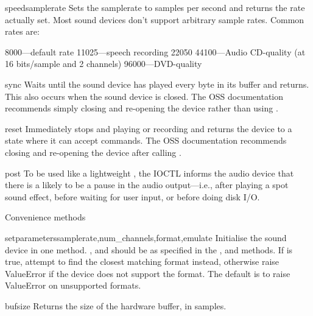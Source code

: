 \begin{methoddesc}{speed}{samplerate}
Sets the samplerate to  samples per second and returns
the rate actually set.  Most sound devices don't support arbitrary
sample rates.  Common rates are:

8000---default rate
11025---speech recording
22050
44100---Audio CD-quality (at 16 bits/sample and 2 channels)
96000---DVD-quality
\end{methoddesc}

\begin{methoddesc}{sync}
Waits until the sound device has played every byte in its buffer and
returns.  This also occurs when the sound device is closed.  The OSS
documentation recommends simply closing and re-opening the device rather
than using .
\end{methoddesc}

\begin{methoddesc}{reset}
Immediately stops and playing or recording and returns the device to a
state where it can accept commands.  The OSS documentation recommends
closing and re-opening the device after calling .
\end{methoddesc}

\begin{methoddesc}{post}
To be used like a lightweight , the 
IOCTL informs the audio device that there is a likely to be a pause in
the audio output---i.e., after playing a spot sound effect, before
waiting for user input, or before doing disk I/O.
\end{methoddesc}

Convenience methods

\begin{methoddesc}{setparameters}{samplerate,num_channels,format,emulate}
Initialise the sound device in one method.  ,
 and  should be as specified in the
,  and 
methods.  If  is true, attempt to find the closest matching
format instead, otherwise raise ValueError if the device does not
support the format.  The default is to raise ValueError on unsupported
formats.
\end{methoddesc}

\begin{methoddesc}{bufsize}{}
Returns the size of the hardware buffer, in samples.
\end{methoddesc}

